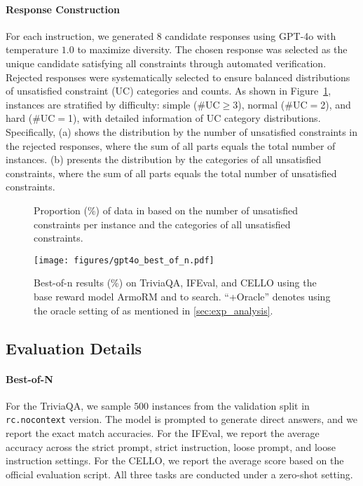 \paragraph{Response Construction} For each instruction, we generated $8$ candidate responses using GPT-4o with temperature $1.0$ to maximize diversity. The chosen response was selected as the unique candidate satisfying all constraints through automated verification. Rejected responses were systematically selected to ensure balanced distributions of unsatisfied constraint (UC) categories and counts. As shown in Figure~\ref{fig:IFbench}, instances are stratified by difficulty: simple (\#UC$\geq$3), normal (\#UC$=$2), and hard (\#UC$=$1), with detailed information of UC category distributions. Specifically, (a) shows the distribution by the number of unsatisfied constraints in the rejected responses, where the sum of all parts equals the total number of instances. (b) presents the distribution by the categories of all unsatisfied constraints, where the sum of all parts equals the total number of unsatisfied constraints.

\begin{figure}[!ht]
    \centering
    \caption{Proportion (\%) of data in \ourdataset based on the number of unsatisfied constraints per instance and the categories of all unsatisfied constraints. }
    \label{fig:IFbench}
\end{figure}

\begin{figure*}
    \centering
    \texttt{[image: figures/gpt4o\_best\_of\_n.pdf]}
    \caption{Best-of-n results (\%) on TriviaQA, IFEval, and CELLO using the base reward model ArmoRM and \ourmethod to search. ``+Oracle'' denotes using the oracle setting of \ourmethod as mentioned in \cref{sec:exp_analysis}.}
    \label{fig:gpt4o_best_of_n}
\end{figure*}


\subsection{Evaluation Details}
\label{sec:app_exp_evaluation}

\paragraph{Best-of-N} For the TriviaQA, we sample $500$ instances from the validation split in \texttt{rc.nocontext} version. The model is prompted to generate direct answers, and we report the exact match accuracies. For the IFEval, we report the average accuracy across the strict prompt, strict instruction, loose prompt, and loose instruction settings. For the CELLO, we report the average score based on the official evaluation script. All three tasks are conducted under a zero-shot setting.

